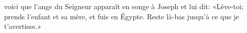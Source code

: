 \encetemps
	voici que l’ange du Seigneur apparaît en songe à Joseph et lui dit:
	«Lève-toi; prends l’enfant et sa mère, et fuis en Égypte.
Reste là-bas jusqu’à ce que je t’avertisse.»
